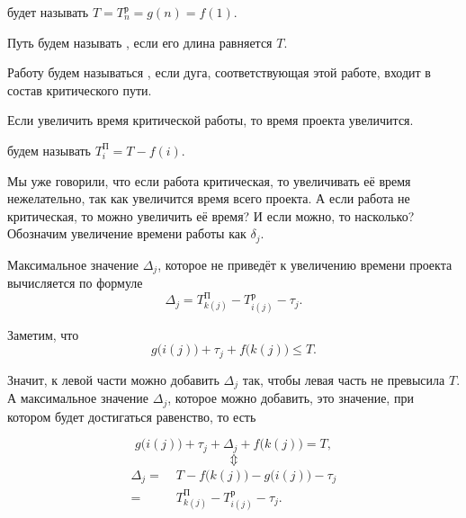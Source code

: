 
 будет называть $T = T_n^{\text{р}} = g(n) = f(1)$.


Путь будем называть , если его длина равняется $T$.


Работу будем называться , если дуга, соответствующая этой работе, входит в состав критического пути.

\remark

Если увеличить время критической работы, то время проекта увеличится.


 будем называть $T_i^{\text{П}} = T - f(i)$.

\remark

Мы уже говорили, что если работа критическая, то увеличивать её время нежелательно, так как увеличится время всего проекта. А если работа не критическая, то можно увеличить её время? И если можно, то насколько? Обозначим увеличение времени работы как $\delta_j$.

\fact

Максимальное значение $\Delta_j$, которое не приведёт к увеличению времени проекта вычисляется по формуле
\[
\Delta_j = T_{k(j)}^{\text{П}} - T_{i(j)}^{\text{р}} - \tau_j.
\]

\prooof

Заметим, что
\[
g\big(i(j)\big) + \tau_j + f\big(k(j)\big) \le T.
\]

Значит, к левой части можно добавить $\Delta_j$ так, чтобы левая часть не превысила $T$. А максимальное значение $\Delta_j$, которое можно добавить, это значение, при котором будет достигаться равенство, то есть

\[
g\big(i(j)\big) + \tau_j + \Delta_j + f\big(k(j)\big) = T,
\]
\[
\Updownarrow
\]
\begin{align*}
	\Delta_j =& \; T - 	f\big(k(j)\big) - g\big(i(j)\big) - \tau_j \\
	=& \; T_{k(j)}^{\text{П}} - T_{i(j)}^{\text{р}} - \tau_j.
\end{align*}

